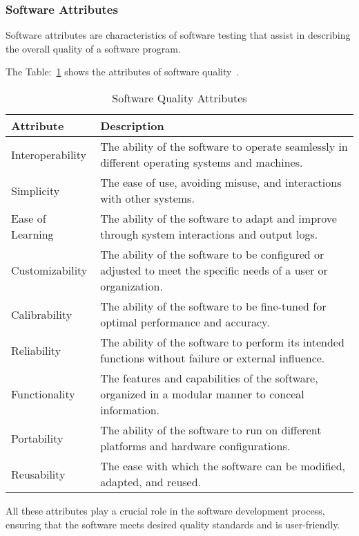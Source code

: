 \subsubsection{Software Attributes}

Software attributes are characteristics of software testing that assist in describing the
overall quality of a software program.

The Table:~\ref{tab:software-attributes} shows the attributes of software quality~\cite{mili2015software}.

\begin{table}[H]
\caption{Software Quality Attributes}
\label{tab:software-attributes}
\begin{tabularx}{\textwidth}{lX}
\toprule
\textbf{Attribute} & \textbf{Description} \\
\midrule
Interoperability & The ability of the software to operate seamlessly in different operating systems and machines. \\
Simplicity & The ease of use, avoiding misuse, and interactions with other systems. \\
Ease of Learning & The ability of the software to adapt and improve through system interactions and output logs. \\
Customizability & The ability of the software to be configured or adjusted to meet the specific needs of a user or organization. \\
Calibrability & The ability of the software to be fine-tuned for optimal performance and accuracy. \\
Reliability & The ability of the software to perform its intended functions without failure or external influence. \\
Functionality & The features and capabilities of the software, organized in a modular manner to conceal information. \\
Portability & The ability of the software to run on different platforms and hardware configurations. \\
Reusability & The ease with which the software can be modified, adapted, and reused. \\
\bottomrule
\end{tabularx}
\end{table}

All these attributes play a crucial role in the software development process, ensuring that the
software meets desired quality standards and is user-friendly.



